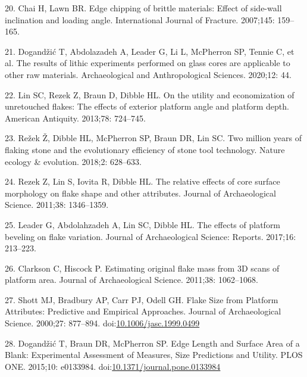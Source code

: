 \documentclass[10pt,letterpaper]{article}
\newenvironment{cslreferences}%
  {}%
  {\par}
\begin{document}
\begin{cslreferences}
\leavevmode\hypertarget{ref-chai_edge_2007}{}%
20. Chai H, Lawn BR. Edge chipping of brittle materials: Effect of
side-wall inclination and loading angle. International Journal of
Fracture. 2007;145: 159--165.

\leavevmode\hypertarget{ref-dogandzic_results_2020}{}%
21. Dogandžić T, Abdolazadeh A, Leader G, Li L, McPherron SP, Tennie C,
et al. The results of lithic experiments performed on glass cores are
applicable to other raw materials. Archaeological and Anthropological
Sciences. 2020;12: 44.

\leavevmode\hypertarget{ref-lin_utility_2013-1}{}%
22. Lin SC, Rezek Z, Braun D, Dibble HL. On the utility and
economization of unretouched flakes: The effects of exterior platform
angle and platform depth. American Antiquity. 2013;78: 724--745.

\leavevmode\hypertarget{ref-rezek_two_2018-1}{}%
23. Režek Ž, Dibble HL, McPherron SP, Braun DR, Lin SC. Two million
years of flaking stone and the evolutionary efficiency of stone tool
technology. Nature ecology \& evolution. 2018;2: 628--633.

\leavevmode\hypertarget{ref-rezek_relative_2011-1}{}%
24. Rezek Z, Lin S, Iovita R, Dibble HL. The relative effects of core
surface morphology on flake shape and other attributes. Journal of
Archaeological Science. 2011;38: 1346--1359.

\leavevmode\hypertarget{ref-leader_effects_2017}{}%
25. Leader G, Abdolahzadeh A, Lin SC, Dibble HL. The effects of platform
beveling on flake variation. Journal of Archaeological Science: Reports.
2017;16: 213--223.

\leavevmode\hypertarget{ref-clarkson_estimating_2011-1}{}%
26. Clarkson C, Hiscock P. Estimating original flake mass from 3D scans
of platform area. Journal of Archaeological Science. 2011;38:
1062--1068.

\leavevmode\hypertarget{ref-shott_flake_2000}{}%
27. Shott MJ, Bradbury AP, Carr PJ, Odell GH. Flake Size from Platform
Attributes: Predictive and Empirical Approaches. Journal of
Archaeological Science. 2000;27: 877--894.
doi:\href{https://doi.org/10.1006/jasc.1999.0499}{10.1006/jasc.1999.0499}

\leavevmode\hypertarget{ref-dogandzic_edge_2015}{}%
28. Dogandžić T, Braun DR, McPherron SP. Edge Length and Surface Area of
a Blank: Experimental Assessment of Measures, Size Predictions and
Utility. PLOS ONE. 2015;10: e0133984.
doi:\href{https://doi.org/10.1371/journal.pone.0133984}{10.1371/journal.pone.0133984}


\end{cslreferences}
\end{document}
